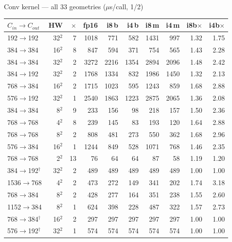\documentclass[aspectratio=169,10pt]{beamer}
\newcommand{\g}[1]{{\footnotesize\color{gray}#1}}
\begin{document}
\begin{frame}{Conv kernel --- all 33 geometries \g{($\mu$s/call, 1/2)}}
\centering\tiny\begin{tabular}{@{}lrrrrrrrrr@{}}\toprule
$C_{in}\!\to\!C_{out}$ & HW & $\times$ & fp16 & i8\,b & i4\,b & i8\,m & i4\,m & i8b$\times$ & i4b$\times$\\\midrule
192$\to$192 & 32$^2$ & 7 & 1018 & 771 & 582 & 1431 & 997 & 1.32 & 1.75\\
384$\to$384 & 16$^2$ & 8 & 847 & 594 & 371 & 754 & 565 & 1.43 & 2.28\\
384$\to$384 & 32$^2$ & 2 & 3272 & 2216 & 1354 & 2894 & 2096 & 1.48 & 2.42\\
384$\to$192 & 32$^2$ & 2 & 1768 & 1334 & 832 & 1986 & 1450 & 1.32 & 2.13\\
768$\to$384 & 16$^2$ & 2 & 1715 & 1023 & 595 & 1243 & 859 & 1.68 & 2.88\\
576$\to$192 & 32$^2$ & 1 & 2540 & 1863 & 1223 & 2875 & 2065 & 1.36 & 2.08\\
384$\to$384 & 8$^2$ & 9 & 233 & 156 & 98 & 218 & 157 & 1.50 & 2.36\\
768$\to$768 & 4$^2$ & 8 & 239 & 145 & 83 & 193 & 120 & 1.64 & 2.88\\
768$\to$768 & 8$^2$ & 2 & 808 & 481 & 273 & 550 & 362 & 1.68 & 2.96\\
576$\to$384 & 16$^2$ & 1 & 1244 & 849 & 528 & 1071 & 768 & 1.46 & 2.35\\
768$\to$768 & 2$^2$ & 13 & 76 & 64 & 64 & 87 & 58 & 1.19 & 1.20\\
384$\to$192$^\dagger$ & 32$^2$ & 2 & 489 & 489 & 489 & 489 & 489 & 1.00 & 1.00\\
1536$\to$768 & 4$^2$ & 2 & 473 & 272 & 149 & 341 & 202 & 1.74 & 3.18\\
768$\to$384 & 8$^2$ & 2 & 428 & 277 & 164 & 351 & 238 & 1.55 & 2.60\\
1152$\to$384 & 8$^2$ & 1 & 624 & 398 & 228 & 487 & 322 & 1.57 & 2.73\\
768$\to$384$^\dagger$ & 16$^2$ & 2 & 297 & 297 & 297 & 297 & 297 & 1.00 & 1.00\\
576$\to$192$^\dagger$ & 32$^2$ & 1 & 574 & 574 & 574 & 574 & 574 & 1.00 & 1.00\\
\bottomrule\end{tabular}
\par{}
\end{frame}
\end{document}
